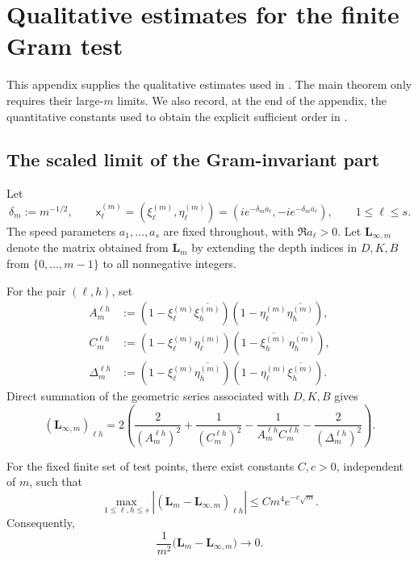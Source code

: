\section{Qualitative estimates for the finite Gram test}
\label{app:quantitative}

This appendix supplies the qualitative estimates used in
.  The main theorem only requires their
large-$m$ limits.  We also record, at the end of the appendix, the
quantitative constants used to obtain the explicit sufficient order in
.

\subsection{The scaled limit of the Gram-invariant part}

Let
\[
 \delta_m:=m^{-1/2},\qquad
 \mathsf x_\ell^{(m)}
 =(\xi_\ell^{(m)},\eta_\ell^{(m)})
 =\left(ie^{-\delta_m a_\ell},
        -ie^{-\delta_m\overline{a_\ell}}\right),
 \qquad 1\le\ell\le s.
\]
The speed parameters $a_1,\ldots,a_s$ are fixed throughout, with
$\Re a_\ell>0$.  Let $\mathbf L_{\infty,m}$ denote the matrix obtained
from $\mathbf L_m$ by extending the depth indices in $D,K,B$ from
$\{0,\ldots,m-1\}$ to all nonnegative integers.

For the pair $(\ell,h)$, set
\[
\begin{aligned}
 A_m^{\ell h}
 &:=(1-\xi_\ell^{(m)}\overline{\xi_h^{(m)}})
    (1-\eta_\ell^{(m)}\overline{\eta_h^{(m)}}),\\
 C_m^{\ell h}
 &:=(1-\xi_\ell^{(m)}\eta_\ell^{(m)})
    (1-\overline{\xi_h^{(m)}}\,\overline{\eta_h^{(m)}}),\\
 \Delta_m^{\ell h}
 &:=(1-\xi_\ell^{(m)}\overline{\eta_h^{(m)}})
    (1-\eta_\ell^{(m)}\overline{\xi_h^{(m)}}).
\end{aligned}
\]
Direct summation of the geometric series associated with $D,K,B$ gives
\begin{equation}\label{B:eq:Linfty}
 (\mathbf L_{\infty,m})_{\ell h}
 =
 2\left(
 \frac{2}{(A_m^{\ell h})^2}
 +\frac{1}{(C_m^{\ell h})^2}
 -\frac{1}{A_m^{\ell h}C_m^{\ell h}}
 -\frac{2}{(\Delta_m^{\ell h})^2}
 \right).
\end{equation}

\begin{lemma}\label{B:lem:tail}
For the fixed finite set of test points, there exist constants
$C,c>0$, independent of $m$, such that
\[
 \max_{1\le\ell,h\le s}
 \left|
 (\mathbf L_m-\mathbf L_{\infty,m})_{\ell h}
 \right|
 \le C m^4 e^{-c\sqrt m}.
\]
Consequently,
\[
        \frac{1}{m^2}
        \bigl(\mathbf L_m-\mathbf L_{\infty,m}\bigr)
        \longrightarrow0.
\]
\end{lemma}

